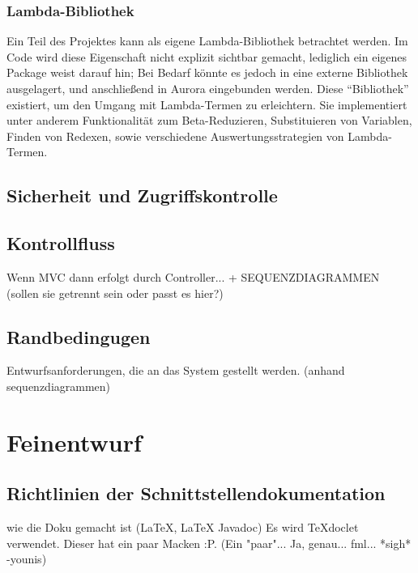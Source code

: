 \documentclass[parskip=full,11pt,twoside]{scrbook}
\begin{document}
\subsubsection{Lambda-Bibliothek}
Ein Teil des Projektes kann als eigene Lambda-Bibliothek betrachtet werden.
Im Code wird diese Eigenschaft nicht explizit sichtbar gemacht, lediglich ein eigenes Package weist darauf hin;
Bei Bedarf könnte es jedoch in eine externe Bibliothek ausgelagert, und anschließend in Aurora eingebunden werden.
Diese \enquote{Bibliothek} existiert, um den Umgang mit Lambda-Termen zu erleichtern.
Sie implementiert unter anderem Funktionalität zum Beta-Reduzieren, Substituieren von Variablen, Finden von Redexen, sowie verschiedene Auswertungsstrategien von Lambda-Termen.


\subsection{Sicherheit und Zugriffskontrolle}
\subsection{Kontrollfluss}
Wenn MVC dann erfolgt durch Controller...  + SEQUENZDIAGRAMMEN (sollen sie getrennt sein oder passt es hier?)
\subsection{Randbedingugen}
Entwurfsanforderungen, die an das System gestellt werden. (anhand sequenzdiagrammen)
\pagebreak

\section{Feinentwurf}



\subsection{Richtlinien der Schnittstellendokumentation}

wie die Doku gemacht ist (LaTeX, LaTeX Javadoc)
Es wird TeXdoclet verwendet. Dieser hat ein paar Macken :P. (Ein "paar"... Ja, genau... fml... *sigh* -younis)
\end{document}
